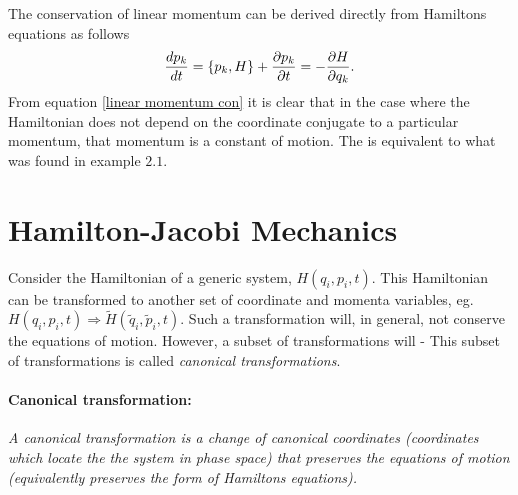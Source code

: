 \begin{example}
	The conservation of linear momentum can be derived directly from Hamiltons equations as follows
	\begin{equation}
		\frac{d p_k}{dt}=\{p_k,H\}+\frac{\partial p_k}{\partial t}=-\frac{\partial H}{\partial q_k}\\.
		\label{linear momentum con}
	\end{equation} 
	From equation \eqref{linear momentum con} it is clear that in the case where the Hamiltonian does not depend on the coordinate conjugate to a particular momentum, that momentum is a constant of motion. The is equivalent to what was found in example $2.1$.
\end{example}

\section{Hamilton-Jacobi Mechanics}
Consider the Hamiltonian of a generic system, $H(q_i,p_i,t)$. This Hamiltonian can be transformed to another set of coordinate and momenta  variables, eg. $H(q_i,p_i,t)\Rightarrow \tilde{H}(\tilde{q}_i,\tilde{p}_i,t)$. Such a transformation will, in general, not conserve the equations of motion. However, a subset of transformations will - This subset of transformations is called \emph{canonical transformations}.
\paragraph{Canonical transformation:} \emph{A canonical transformation is a change of canonical coordinates (coordinates which locate the the system in phase space) that preserves the equations of motion (equivalently preserves the form of Hamiltons equations).}\newline

